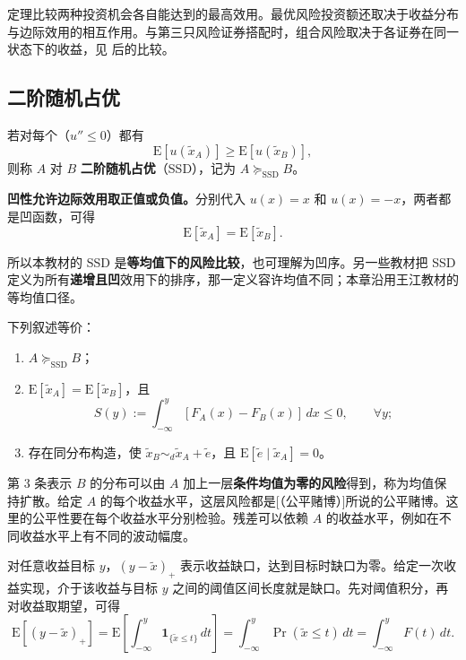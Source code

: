 定理比较两种投资机会各自能达到的最高效用。最优风险投资额还取决于收益分布与边际效用的相互作用。与第三只风险证券搭配时，组合风险取决于各证券在同一状态下的收益，见 后的比较。

\subsection{二阶随机占优}
\begin{tcolorbox}[knowledge]
 若对每个\textbf{}（$u''\le0$）都有
\[
 \mathrm E[u(\tilde x_A)]\ge\mathrm E[u(\tilde x_B)],
\]
则称 $A$ 对 $B$ \textbf{二阶随机占优}（SSD），记为 $A\succeq_{\mathrm{SSD}}B$。
\end{tcolorbox}
\textbf{凹性允许边际效用取正值或负值。}分别代入 $u(x)=x$ 和 $u(x)=-x$，两者都是凹函数，可得
\[
 \mathrm E[\tilde x_A]=\mathrm E[\tilde x_B].
\]

所以本教材的 SSD 是\textbf{等均值下的风险比较}，也可理解为凹序。另一些教材把 SSD 定义为所有\textbf{递增且凹}效用下的排序，那一定义容许均值不同；本章沿用王江教材的等均值口径。

\begin{tcolorbox}[knowledge]
 下列叙述等价：
\begin{enumerate}
 \item $A\succeq_{\mathrm{SSD}}B$；
 \item $\mathrm E[\tilde x_A]=\mathrm E[\tilde x_B]$，且
 \[
 S(y):=\int_{-\infty}^{y}[F_A(x)-F_B(x)]\,dx\le0,\qquad\forall y;
 \]
 \item 存在同分布构造，使 $\tilde x_B\sim_d\tilde x_A+\tilde e$，且
 $\mathrm E[\tilde e\mid\tilde x_A]=0$。
\end{enumerate}
\end{tcolorbox}
第 3 条表示 $B$ 的分布可以由 $A$ 加上一层\textbf{条件均值为零的风险}得到，称为均值保持扩散。给定 $A$ 的每个收益水平，这层风险都是[（公平赌博）]所说的公平赌博。这里的公平性要在每个收益水平分别检验。残差可以依赖 $A$ 的收益水平，例如在不同收益水平上有不同的波动幅度。

对任意收益目标 $y$，$(y-\tilde x)_+$ 表示收益缺口，达到目标时缺口为零。给定一次收益实现，介于该收益与目标 $y$ 之间的阈值区间长度就是缺口。先对阈值积分，再对收益取期望，可得
\[
 \mathrm E[(y-\tilde x)_+]
 =\mathrm E\!\left[\int_{-\infty}^y \mathbf1_{\{\tilde x\le t\}}\,dt\right]
 =\int_{-\infty}^y \Pr(\tilde x\le t)\,dt
 =\int_{-\infty}^y F(t)\,dt.
\]

